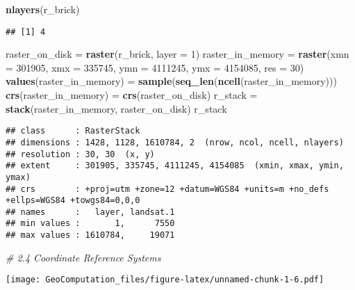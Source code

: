 \documentclass[]{article}
\newenvironment{Shaded}{\begin{snugshade}}{\end{snugshade}}
\newcommand{\CommentTok}[1]{\textcolor[rgb]{0.56,0.35,0.01}{\textit{#1}}}
\newcommand{\DataTypeTok}[1]{\textcolor[rgb]{0.13,0.29,0.53}{#1}}
\newcommand{\DecValTok}[1]{\textcolor[rgb]{0.00,0.00,0.81}{#1}}
\newcommand{\KeywordTok}[1]{\textcolor[rgb]{0.13,0.29,0.53}{\textbf{#1}}}
\newcommand{\NormalTok}[1]{#1}
\newcommand{\StringTok}[1]{\textcolor[rgb]{0.31,0.60,0.02}{#1}}
\begin{document}
\begin{Shaded}
\begin{Highlighting}[]
\KeywordTok{nlayers}\NormalTok{(r_brick)}
\end{Highlighting}
\end{Shaded}

\begin{verbatim}
## [1] 4
\end{verbatim}

\begin{Shaded}
\begin{Highlighting}[]
\NormalTok{raster_on_disk =}\StringTok{ }\KeywordTok{raster}\NormalTok{(r_brick, }\DataTypeTok{layer =} \DecValTok{1}\NormalTok{)}
\NormalTok{raster_in_memory =}\StringTok{ }\KeywordTok{raster}\NormalTok{(}\DataTypeTok{xmn =} \DecValTok{301905}\NormalTok{, }\DataTypeTok{xmx =} \DecValTok{335745}\NormalTok{,}
                          \DataTypeTok{ymn =} \DecValTok{4111245}\NormalTok{, }\DataTypeTok{ymx =} \DecValTok{4154085}\NormalTok{,}
                          \DataTypeTok{res =} \DecValTok{30}\NormalTok{)}
\KeywordTok{values}\NormalTok{(raster_in_memory) =}\StringTok{ }\KeywordTok{sample}\NormalTok{(}\KeywordTok{seq_len}\NormalTok{(}\KeywordTok{ncell}\NormalTok{(raster_in_memory)))}
\KeywordTok{crs}\NormalTok{(raster_in_memory) =}\StringTok{ }\KeywordTok{crs}\NormalTok{(raster_on_disk)}
\NormalTok{r_stack =}\StringTok{ }\KeywordTok{stack}\NormalTok{(raster_in_memory, raster_on_disk)}
\NormalTok{r_stack}
\end{Highlighting}
\end{Shaded}

\begin{verbatim}
## class      : RasterStack 
## dimensions : 1428, 1128, 1610784, 2  (nrow, ncol, ncell, nlayers)
## resolution : 30, 30  (x, y)
## extent     : 301905, 335745, 4111245, 4154085  (xmin, xmax, ymin, ymax)
## crs        : +proj=utm +zone=12 +datum=WGS84 +units=m +no_defs +ellps=WGS84 +towgs84=0,0,0 
## names      :   layer, landsat.1 
## min values :       1,      7550 
## max values : 1610784,     19071
\end{verbatim}

\begin{Shaded}
\begin{Highlighting}[]
\CommentTok{# 2.4 Coordinate Reference Systems}
\end{Highlighting}
\end{Shaded}

\texttt{[image: GeoComputation\_files/figure-latex/unnamed-chunk-1-6.pdf]}
\end{document}
